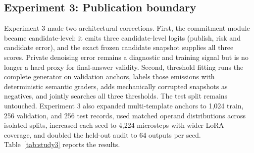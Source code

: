 \documentclass[10pt,a4paper]{article}
\begin{document}
\subsection{Experiment 3: Publication boundary}

Experiment 3 made two architectural corrections. First, the commitment module
became candidate-level: it emits three candidate-level logits (publish, risk
and candidate error), and the exact frozen candidate snapshot supplies
all three scores. Private denoising error remains a diagnostic and training
signal but is no longer a hard proxy for final-answer validity. Second,
threshold fitting runs the complete generator on validation anchors, labels
those emissions with deterministic semantic graders, adds mechanically
corrupted snapshots as negatives, and jointly searches all three thresholds.
The test split remains untouched. Experiment 3 also expanded multi-template anchors
to 1,024 train, 256 validation, and 256 test records, used matched operand
distributions across isolated splits, increased each seed to 4,224 microsteps
with wider LoRA coverage, and doubled the held-out audit to 64 outputs per
seed. Table~\ref{tab:study3} reports the results.
\end{document}
